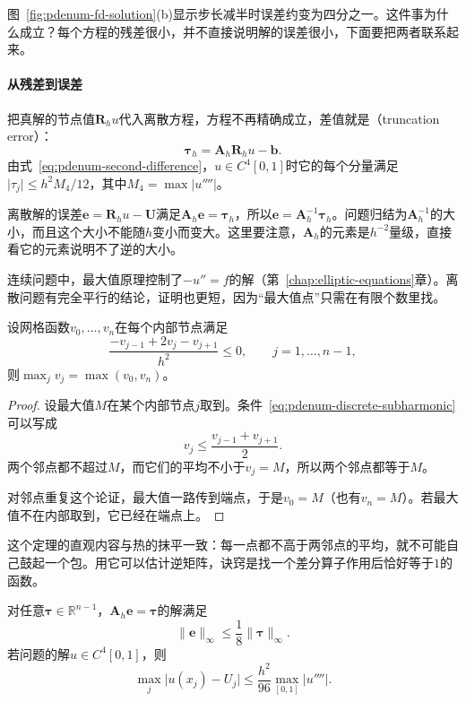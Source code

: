 图~\ref{fig:pdenum-fd-solution}(b)显示步长减半时误差约变为四分之一。这件事为什么成立？每个方程的残差很小，并不直接说明解的误差很小，下面要把两者联系起来。

\paragraph{从残差到误差}
把真解的节点值$\bm{R}_hu$代入离散方程，方程不再精确成立，差值就是（truncation error）：
\begin{equation}
 \bm{\tau}_h=\bm{A}_h\bm{R}_hu-\bm{b}.
 \label{eq:pdenum-truncation}
\end{equation}
由式~\eqref{eq:pdenum-second-difference}，$u\in C^4[0,1]$时它的每个分量满足$\lvert\tau_j\rvert\leq h^2M_4/12$，其中$M_4=\max\lvert u''''\rvert$。

离散解的误差$\bm{e}=\bm{R}_hu-\bm{U}$满足$\bm{A}_h\bm{e}=\bm{\tau}_h$，所以$\bm{e}=\bm{A}_h^{-1}\bm{\tau}_h$。问题归结为$\bm{A}_h^{-1}$的大小，而且这个大小不能随$h$变小而变大。这里要注意，$\bm{A}_h$的元素是$h^{-2}$量级，直接看它的元素说明不了逆的大小。

连续问题中，最大值原理控制了$-u''=f$的解（第~\ref{chap:elliptic-equations}章）。离散问题有完全平行的结论，证明也更短，因为“最大值点”只需在有限个数里找。

\begin{theorem}[离散最大值原理]
 \label{thm:pdenum-discrete-maximum}
 设网格函数$v_0,\ldots,v_n$在每个内部节点满足
 \begin{equation}
  \frac{-v_{j-1}+2v_j-v_{j+1}}{h^2}\leq0,\qquad j=1,\ldots,n-1,
  \label{eq:pdenum-discrete-subharmonic}
 \end{equation}
 则$\max_jv_j=\max(v_0,v_n)$。
\end{theorem}

\begin{proof}
 设最大值$M$在某个内部节点$j$取到。条件~\eqref{eq:pdenum-discrete-subharmonic}可以写成
 \[
  v_j\leq\frac{v_{j-1}+v_{j+1}}{2}.
 \]
 两个邻点都不超过$M$，而它们的平均不小于$v_j=M$，所以两个邻点都等于$M$。

 对邻点重复这个论证，最大值一路传到端点，于是$v_0=M$（也有$v_n=M$）。若最大值不在内部取到，它已经在端点上。
\end{proof}

这个定理的直观内容与热的抹平一致：每一点都不高于两邻点的平均，就不可能自己鼓起一个包。用它可以估计逆矩阵，诀窍是找一个差分算子作用后恰好等于$1$的函数。

\begin{theorem}[三点格式的误差界]
 \label{thm:pdenum-fd-error}
 对任意$\bm{\tau}\in\mathbb{R}^{n-1}$，$\bm{A}_h\bm{e}=\bm{\tau}$的解满足
 \begin{equation}
  \lVert\bm{e}\rVert_\infty\leq\frac18\lVert\bm{\tau}\rVert_\infty .
  \label{eq:pdenum-inverse-bound}
 \end{equation}
 若问题的解$u\in C^4[0,1]$，则
 \begin{equation}
  \max_j\lvert u(x_j)-U_j\rvert\leq\frac{h^2}{96}\max_{[0,1]}\lvert u''''\rvert .
  \label{eq:pdenum-fd-error}
 \end{equation}
\end{theorem}

